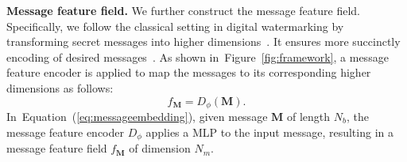 \documentclass[10pt,twocolumn,letterpaper]{article}
\newcommand{\Eref}[1]{Equation~(\ref{#1})}
\newcommand{\Fref}[1]{Figure~\ref{#1}}
\def\M{{\mathbf{M}}}
\begin{document}



\noindent\textbf{Message feature field.} We further construct the message feature field. Specifically, we follow the classical setting in digital watermarking by transforming secret messages into higher dimensions~\cite{NIPS2017_838e8afb, baluja2019hiding}. It ensures more succinctly encoding of desired messages~\cite{NIPS2017_838e8afb}. As shown in~\Fref{fig:framework}, a message feature encoder is applied to map the messages to its corresponding higher dimensions as follows:
\begin{equation}
f_\M=D_{\phi}(\M).
\label{eq:messageembedding}
\end{equation}
In~\Eref{eq:messageembedding}, given message $\M$ of length $N_b$, the message feature encoder $D_{\phi}$ applies a MLP to the input message, resulting in a message feature field $f_\M$ of dimension $N_{m}$. 
\end{document}
